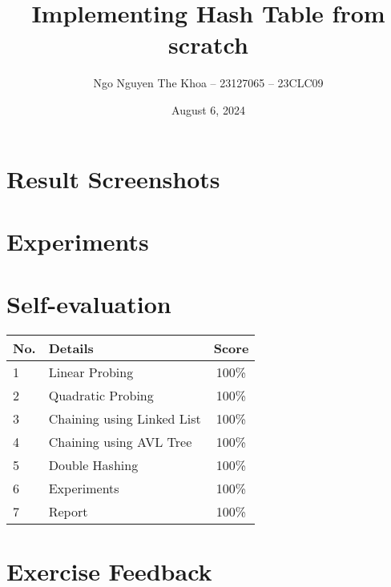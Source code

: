 \documentclass[a4paper,12pt]{report}
\title{Implementing Hash Table from scratch}
\author{Ngo Nguyen The Khoa -- 23127065 -- 23CLC09}
\date{August 6, 2024}
\begin{document}

\tableofcontents\thispagestyle{empty}

\pagebreak


\pagebreak
\section{Result Screenshots}






\pagebreak
\section{Experiments}






\pagebreak
\section{Self-evaluation}
\begin{center}
  \renewcommand{\arraystretch}{1.5}
  \begin{tabular}{|l|p{}|c|}
    \hline
    \textbf{No.} & \textbf{Details}           & \textbf{Score} \\ \hline
    1            & Linear Probing             & 100\%          \\ \hline
    2            & Quadratic Probing          & 100\%          \\ \hline
    3            & Chaining using Linked List & 100\%          \\ \hline
    4            & Chaining using AVL Tree    & 100\%          \\ \hline
    5            & Double Hashing             & 100\%          \\ \hline
    6            & Experiments                & 100\%          \\ \hline
    7            & Report                     & 100\%          \\ \hline
  \end{tabular}
\end{center}

\pagebreak
\section{Exercise Feedback}
\end{document}
